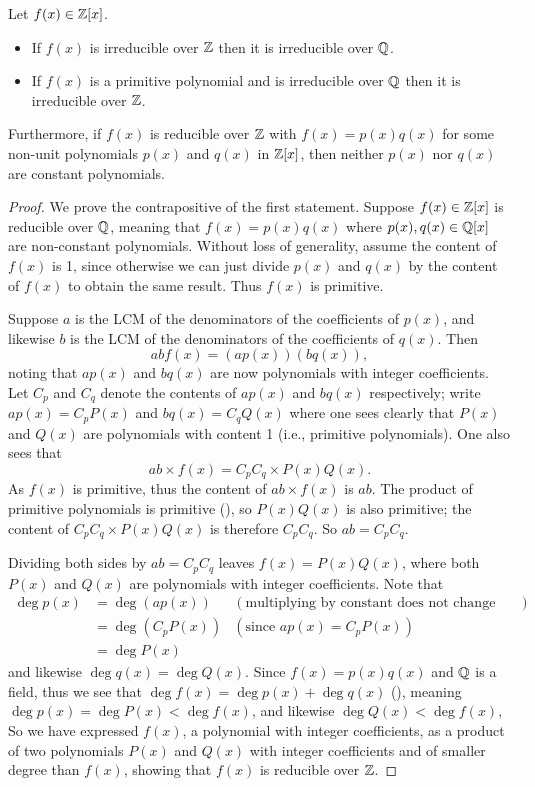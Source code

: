 \begin{theorem}\label{thrm-irreducible-over-Z-means-irreducible-over-Q}
    Let $f(x) \in \mathbb{Z}[x]$.
    \begin{itemize}
        \item If $f(x)$ is irreducible over $\mathbb{Z}$ then it is irreducible over $\mathbb{Q}$.
        \item If $f(x)$ is a primitive polynomial and is irreducible over $\mathbb{Q}$ then it is irreducible over $\mathbb{Z}$.
    \end{itemize}
    Furthermore, if $f(x)$ is reducible over $\mathbb{Z}$ with $f(x) = p(x)q(x)$ for some non-unit polynomials $p(x)$ and $q(x)$ in $\mathbb{Z}[x]$, then neither $p(x)$ nor $q(x)$ are constant polynomials.
\end{theorem}
\begin{proof}
    We prove the contrapositive of the first statement. Suppose $f(x) \in \mathbb{Z}[x]$ is reducible over $\mathbb{Q}$, meaning that $f(x) = p(x)q(x)$ where $p(x), q(x) \in \mathbb{Q}[x]$ are non-constant polynomials. Without loss of generality, assume the content of $f(x)$ is 1, since otherwise we can just divide $p(x)$ and $q(x)$ by the content of $f(x)$ to obtain the same result. Thus $f(x)$ is primitive.

    Suppose $a$ is the LCM of the denominators of the coefficients of $p(x)$, and likewise $b$ is the LCM of the denominators of the coefficients of $q(x)$. Then
    \[
        abf(x) = (ap(x))(bq(x)),
    \]
    noting that $ap(x)$ and $bq(x)$ are now polynomials with integer coefficients. Let $C_p$ and $C_q$ denote the contents of $ap(x)$ and $bq(x)$ respectively; write $ap(x) = C_pP(x)$ and $bq(x) = C_qQ(x)$ where one sees clearly that $P(x)$ and $Q(x)$ are polynomials with content 1 (i.e., primitive polynomials). One also sees that
    \[
        ab \times f(x) = C_pC_q \times P(x)Q(x).
    \]
    As $f(x)$ is primitive, thus the content of $ab \times f(x)$ is $ab$. The product of primitive polynomials is primitive (), so $P(x)Q(x)$ is also primitive; the content of $C_pC_q \times P(x)Q(x)$ is therefore $C_pC_q$. So $ab = C_pC_q$.

    Dividing both sides by $ab = C_pC_q$ leaves $f(x) = P(x)Q(x)$, where both $P(x)$ and $Q(x)$ are polynomials with integer coefficients. Note that
    \begin{align*}
        \deg p(x) &= \deg (ap(x)) & (\text{multiplying by constant does not change degree})\\
        &= \deg(C_pP(x)) & (\text{since } ap(x) = C_pP(x))\\
        &= \deg P(x)
    \end{align*}
    and likewise $\deg q(x) = \deg Q(x)$. Since $f(x) = p(x)q(x)$ and $\mathbb{Q}$ is a field, thus we see that $\deg f(x) = \deg p(x) + \deg q(x)$ (), meaning $\deg p(x) = \deg P(x) < \deg f(x)$, and likewise $\deg Q(x) < \deg f(x)$, So we have expressed $f(x)$, a polynomial with integer coefficients, as a product of two polynomials $P(x)$ and $Q(x)$ with integer coefficients and of smaller degree than $f(x)$, showing that $f(x)$ is reducible over $\mathbb{Z}$.


\end{proof}
